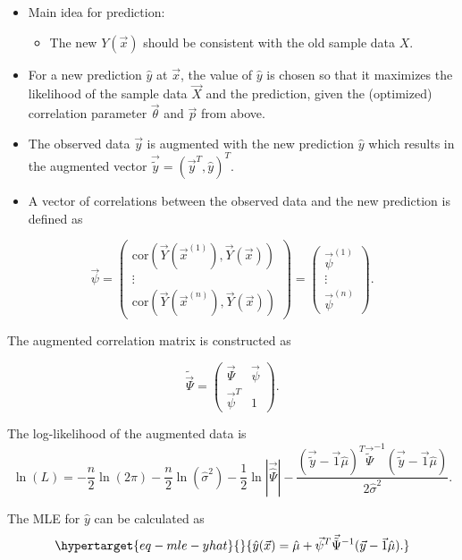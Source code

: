 \documentclass[
  letterpaper,
  DIV=11,
  numbers=noendperiod]{scrreprt}
\providecommand{\tightlist}{%
  \setlength{\itemsep}{0pt}\setlength{\parskip}{0pt}}\usepackage{longtable,booktabs,array}
\begin{document}
\begin{itemize}
\tightlist
\item
  Main idea for prediction:

  \begin{itemize}
  \tightlist
  \item
    The new \(Y(\vec{x})\) should be consistent with the old sample data
    \(X\).
  \end{itemize}
\item
  For a new prediction \(\hat{y}\) at \(\vec{x}\), the value of
  \(\hat{y}\) is chosen so that it maximizes the likelihood of the
  sample data \(\vec{X}\) and the prediction, given the (optimized)
  correlation parameter \(\vec{\theta}\) and \(\vec{p}\) from above.
\item
  The observed data \(\vec{y}\) is augmented with the new prediction
  \(\hat{y}\) which results in the augmented vector
  \(\vec{\tilde{y}} = ( \vec{y}^T, \hat{y})^T\).
\item
  A vector of correlations between the observed data and the new
  prediction is defined as
\end{itemize}

\[
\vec{\psi} = 
\begin{pmatrix}
\text{cor}\left(
\vec{Y}(\vec{x}^{(1)}),
\vec{Y}(\vec{x}) 
\right) \\
\vdots  \\
\text{cor}\left(
\vec{Y}(\vec{x}^{(n)}),
\vec{Y}(\vec{x}) 
\right)
\end{pmatrix}
=
\begin{pmatrix}
\vec{\psi}^{(1)}\\
\vdots\\
\vec{\psi}^{(n)}
\end{pmatrix}.
\]

The augmented correlation matrix is constructed as

\[
\tilde{\vec{\Psi}} =
\begin{pmatrix}
\vec{\Psi} & \vec{\psi} \\
\vec{\psi}^T & 1
\end{pmatrix}.
\]

The log-likelihood of the augmented data is \[
\ln(L) = - \frac{n}{2} \ln(2\pi) - \frac{n}{2} \ln(\hat{\sigma}^2) - \frac{1}{2} \ln |\vec{\hat{\Psi}}| -  \frac{(\vec{\tilde{y}} - \vec{1}\hat{\mu})^T \vec{\tilde{\Psi}}^{-1}(\vec{\tilde{y}} - \vec{1}\hat{\mu})}{2 \hat{\sigma}^2}.
\]

The MLE for \(\hat{y}\) can be calculated as
\begin{equation}\protect\hypertarget{eq-mle-yhat}{}{
\hat{y}(\vec{x}) = \hat{\mu} + \vec{\psi}^T \vec{\tilde{\Psi}}^{-1} (\vec{y} - \vec{1}\hat{\mu}).
}\label{eq-mle-yhat}\end{equation}
\end{document}
